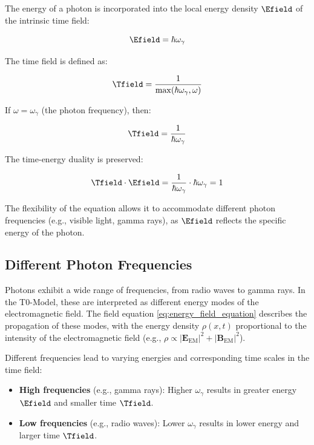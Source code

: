 The energy of a photon is incorporated into the local energy density \( \Efield \) of the intrinsic time field:

\begin{equation}
	\Efield = \hbar \omega_\gamma
\end{equation}

The time field is defined as:

\begin{equation}
	\Tfield = \frac{1}{\max(\hbar \omega_\gamma, \omega)}
\end{equation}

If \(\omega = \omega_\gamma\) (the photon frequency), then:

\begin{equation}
	\Tfield = \frac{1}{\hbar \omega_\gamma}
\end{equation}

The time-energy duality is preserved:

\begin{equation}
	\Tfield \cdot \Efield = \frac{1}{\hbar \omega_\gamma} \cdot \hbar \omega_\gamma = 1
\end{equation}

The flexibility of the equation allows it to accommodate different photon frequencies (e.g., visible light, gamma rays), as \( \Efield \) reflects the specific energy of the photon.

\subsection{Different Photon Frequencies}
\label{subsec:photon_frequencies}

Photons exhibit a wide range of frequencies, from radio waves to gamma rays. In the T0-Model, these are interpreted as different energy modes of the electromagnetic field. The field equation \eqref{eq:energy_field_equation} describes the propagation of these modes, with the energy density \(\rho(x,t)\) proportional to the intensity of the electromagnetic field (e.g., \( \rho \propto |\mathbf{E}_{\text{EM}}|^2 + |\mathbf{B}_{\text{EM}}|^2 \)).

Different frequencies lead to varying energies and corresponding time scales in the time field:

\begin{itemize}
	\item \textbf{High frequencies} (e.g., gamma rays): Higher \(\omega_\gamma\) results in greater energy \( \Efield \) and smaller time \( \Tfield \).
	\item \textbf{Low frequencies} (e.g., radio waves): Lower \(\omega_\gamma\) results in lower energy and larger time \( \Tfield \).
\end{itemize}

